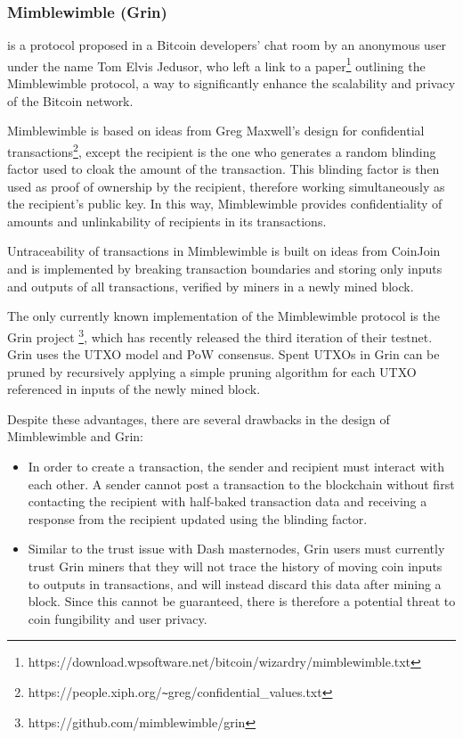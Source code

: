 \documentclass[a4paper, 10pt, conference]{ieeeconf}
\begin{document}
\subsubsection{Mimblewimble (Grin)} is a protocol proposed in a Bitcoin developers' chat room by an anonymous user under the name Tom Elvis Jedusor, who left a link to a paper\footnote{https://download.wpsoftware.net/bitcoin/wizardry/mimblewimble.txt} outlining the Mimblewimble protocol, a way to significantly enhance the scalability and privacy of the Bitcoin network.

Mimblewimble is based on ideas from Greg Maxwell's design for confidential transactions\footnote{https://people.xiph.org/\texttt{\~{}}greg/confidential\_values.txt}, except the recipient is the one who generates a random blinding factor used to cloak the amount of the transaction. This blinding factor is then used as proof of ownership by the recipient, therefore working simultaneously as the recipient's public key. In this way, Mimblewimble provides confidentiality of amounts and unlinkability of recipients in its transactions.

Untraceability of transactions in Mimblewimble is built on ideas from CoinJoin and is implemented by breaking transaction boundaries and storing only inputs and outputs of all transactions, verified by miners in a newly mined block.

The only currently known  implementation of the Mimblewimble protocol is the Grin project \footnote{https://github.com/mimblewimble/grin}, which has recently released the third iteration of their testnet. Grin uses the UTXO model and PoW consensus. Spent UTXOs in Grin can be pruned by recursively applying a simple pruning algorithm for each UTXO referenced in inputs of the newly mined block.

Despite these advantages, there are several drawbacks in the design of Mimblewimble and Grin:

\begin{itemize}
	\item {In order to create a transaction, the sender and recipient must interact with each other. A sender cannot post a transaction to the blockchain without first contacting the recipient with half-baked transaction data and receiving a response from the recipient updated using the blinding factor.}
	\item {Similar to the trust issue with Dash masternodes, Grin users must currently trust Grin miners that they will not trace the history of moving coin inputs to outputs in transactions, and will instead discard this data after mining a block. Since this cannot be guaranteed, there is therefore a potential threat to coin fungibility and user privacy.}
\end{itemize}
\end{document}
